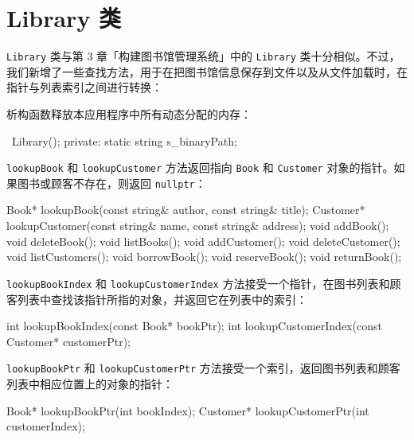 \section{Library 类}

\texttt{Library} 类与第 3 章「构建图书馆管理系统」中的 \texttt{Library} 类十分相似。不过，我们新增了一些查找方法，用于在把图书馆信息保存到文件以及从文件加载时，在指针与列表索引之间进行转换：

\medskip{}

\begin{codebox}
class Library {
  public:
    Library();
\end{codebox}

析构函数释放本应用程序中所有动态分配的内存：

\begin{codebox}
    ~Library();
  private:
    static string s_binaryPath;
\end{codebox}

\texttt{lookupBook} 和 \texttt{lookupCustomer} 方法返回指向 \texttt{Book} 和 \texttt{Customer} 对象的指针。如果图书或顾客不存在，则返回 \texttt{nullptr}：

\begin{codebox}
    Book* lookupBook(const string& author,
                     const string& title);
    Customer* lookupCustomer(const string& name,
                             const string& address);
    void addBook();
    void deleteBook();
    void listBooks();
    void addCustomer();
    void deleteCustomer();
    void listCustomers();
    void borrowBook();
    void reserveBook();
    void returnBook();
\end{codebox}

\texttt{lookupBookIndex} 和 \texttt{lookupCustomerIndex} 方法接受一个指针，在图书列表和顾客列表中查找该指针所指的对象，并返回它在列表中的索引：

\begin{codebox}
    int lookupBookIndex(const Book* bookPtr);
    int lookupCustomerIndex(const Customer* customerPtr);
\end{codebox}

\texttt{lookupBookPtr} 和 \texttt{lookupCustomerPtr} 方法接受一个索引，返回图书列表和顾客列表中相应位置上的对象的指针：

\begin{codebox}
    Book* lookupBookPtr(int bookIndex);
    Customer* lookupCustomerPtr(int customerIndex);
\end{codebox}

